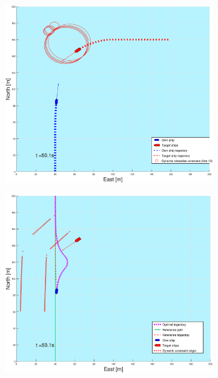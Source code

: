 \begin{figure}[ht!]
\begin{subfigure}[b]{0.499\textwidth}
    \end{subfigure}
    \hfill
    \\
    \begin{subfigure}[b]{0.49\textwidth}
        \centering
        \includegraphics[width=\textwidth]{Images/Figures/sving_HO/_Simple_0fig1_time=50}
    \end{subfigure}
    \hfill
    \begin{subfigure}[b]{0.499\textwidth}
        \centering
        \includegraphics[width=\textwidth]{Images/Figures/sving_HO/_Simple_0fig999_time=50}

\end{subfigure}
\end{figure}
